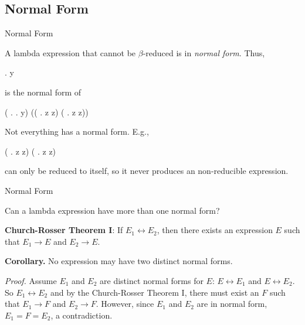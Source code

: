 \documentclass{plt}
\begin{document}
\subsection{Normal Form}

\begin{frame}[fragile=singleslide]{Normal Form}

A lambda expression that cannot be $\beta$-reduced is in \emph{normal
  form}.  Thus,

\begin{lcalc}
 . y
\end{lcalc}

is the normal form of

\begin{lcalc}
( .  . y) \big(( . z z) ( . z z)\big)
\end{lcalc}

Not everything has a normal form.  E.g.,

\begin{lcalc}
( . z z) ( . z z)
\end{lcalc}

can only be reduced to itself, so it never produces an non-reducible
expression.

\end{frame}

\begin{frame}[fragile=singleslide]{Normal Form}

Can a lambda expression have more than one normal form?

\vspace{2pc}

\shadowstart
\begin{minipage}{0.9\textwidth}
\textbf{Church-Rosser Theorem I}: If $E_1 \leftrightarrow E_2$, then there
exists an expression $E$ such that $E_1 \rightarrow E$ and $E_2
\rightarrow E$.
\end{minipage}
\shadowend

\vspace{2pc}

\shadowstart
\textbf{Corollary.} No expression may have two distinct normal forms.
\shadowend

\emph{Proof.} Assume $E_1$ and $E_2$ are distinct normal forms for $E$: $E
\leftrightarrow E_1$ and $E \leftrightarrow E_2$.  So $E_1
\leftrightarrow E_2$ and by the Church-Rosser Theorem I, there must
exist an $F$ such that $E_1 \rightarrow F$ and $E_2 \rightarrow F$.
However, since $E_1$ and $E_2$ are in normal form, $E_1 = F = E_2$, a
contradiction.

\end{frame}
\end{document}
